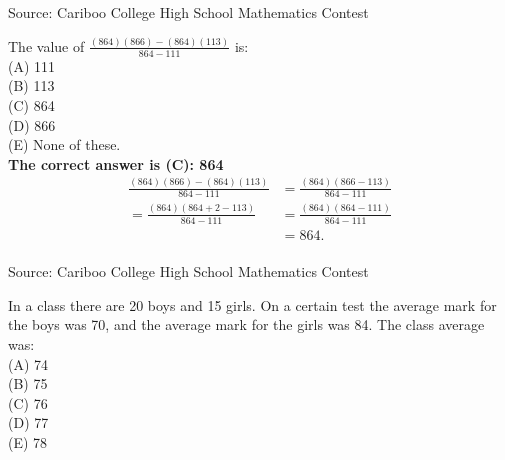 \documentclass{article}
\begin{document}
\parindent=0cm
\parskip=6pt
\pagestyle{empty}


\scriptsize
Source: Cariboo College High School Mathematics Contest

\normalsize
The value of $\frac{(864)(866)-(864)(113)}{864-111}$ is:\\
(A) 111\\
(B) 113\\
(C) 864\\
(D) 866\\
(E) None of these.\\


\textbf{The correct answer is (C): 864}\\[1 ex]
\begin{align*}
\frac{(864)(866)-(864)(113)}{864-111}&=\frac{(864)(866-113)}{864-111}\\
=\frac{(864)(864+2-113)}{864-111}&=\frac{(864)(864-111)}{864-111}\\
&=864.
\end{align*}
\\[5 ex]

\scriptsize
Source: Cariboo College High School Mathematics Contest

\normalsize
In a class there are 20 boys and 15 girls. On a certain test the average mark for the boys was 70, and the average mark for the girls was 84. The class average was:\\
(A) 74\\
(B) 75\\
(C) 76\\
(D) 77\\
(E) 78\\
\end{document}
